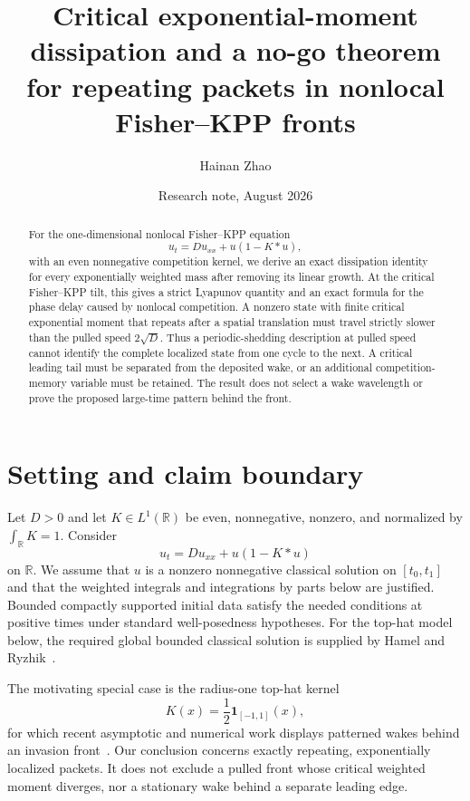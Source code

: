 \documentclass[11pt]{article}
\title{Critical exponential-moment dissipation and a no-go theorem\\
for repeating packets in nonlocal Fisher--KPP fronts}
\author{Hainan Zhao}
\date{Research note, August 2026}
\newcommand{\R}{\mathbb R}
\begin{document}
\maketitle

\begin{abstract}
For the one-dimensional nonlocal Fisher--KPP equation
\[
 u_t=D u_{xx}+u(1-K*u),
\]
with an even nonnegative competition kernel, we derive an exact dissipation
identity for every exponentially weighted mass after removing its linear
growth.  At the critical Fisher--KPP tilt, this gives a strict Lyapunov
quantity and an exact formula for the phase delay caused by nonlocal
competition.  A nonzero state with finite critical exponential moment that
repeats after a spatial translation must travel strictly slower than the
pulled speed $2\sqrt D$.  Thus a periodic-shedding description at pulled speed
cannot identify the complete localized state from one cycle to the next.  A
critical leading tail must be separated from the deposited wake, or an
additional competition-memory variable must be retained.  The result does
not select a wake wavelength or prove the proposed large-time pattern behind
the front.
\end{abstract}

\section{Setting and claim boundary}

Let $D>0$ and let $K\in L^1(\R)$ be even, nonnegative, nonzero, and normalized
by $\int_{\R}K=1$.  Consider
\begin{equation}
 u_t=D u_{xx}+u(1-K*u)
\end{equation}
on $\R$.  We assume that $u$ is a nonzero nonnegative classical solution on
$[t_0,t_1]$ and that the weighted integrals and integrations by parts below
are justified.  Bounded compactly supported initial data satisfy the needed
conditions at positive times under standard well-posedness hypotheses.  For
the top-hat model below, the required global bounded classical solution is
supplied by Hamel and Ryzhik~\cite[Theorem~1.2]{HamelRyzhik2014}.

The motivating special case is the radius-one top-hat kernel
\begin{equation}
 K(x)=\frac12\mathbf 1_{[-1,1]}(x),
\end{equation}
for which recent asymptotic and numerical work displays patterned wakes
behind an invasion front~\cite{NeedhamEtAl2025}.  Our conclusion concerns
exactly repeating, exponentially localized packets.  It does not exclude a
pulled front whose critical weighted moment diverges, nor a stationary wake
behind a separate leading edge.
\end{document}
